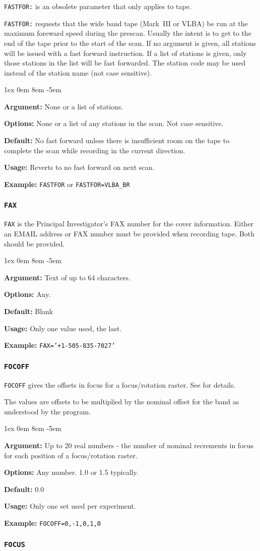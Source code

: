 \documentclass{report}
\newcommand{\rcwbox}[5]{
  \begin{list}{}{\parsep 1ex  \itemsep 0em
                 \leftmargin 8em  \itemindent -5em }
    \item {\bf Argument:} #1
    \item {\bf Options:}  #2
    \item {\bf Default:}  #3
    \item {\bf Usage:}    #4
    \item {\bf Example:}  #5
  \end{list}
}
\begin{document}
{\tt FASTFOR:} is an obsolete parameter that only applies to tape.

{\tt FASTFOR:} requests that the wide band tape (Mark~III or
VLBA) be run at the maximum foreward speed during the prescan. Usually
the intent is to get to the end of the tape prior to the start of the
scan. If no argument is given, all stations will be issued with a fast
forward instruction. If a list of stations is given, only those
stations in the list will be fast forwarded.  The station code may
be used instead of the station name (not case sensitive).

\rcwbox
{None or a list of stations.}
{None or a list of any stations in the scan. Not case sensitive.}
{No fast forward unless there is insufficient room on the tape to
complete the scan while recording in the current direction.}
{Reverts to no fast forward on next scan.}
{{\tt FASTFOR} or {\tt FASTFOR=VLBA\_BR}}


\subsubsection{\label{MP:FAX}{\tt FAX}}

{\tt FAX} is the  Principal Investigator's FAX number for the cover
information.  Either an EMAIL address or FAX number must be provided
when recording tape.  Both should be provided.

\rcwbox
{Text of up to 64 characters.}
{Any.}
{Blank}
{Only one value used, the last.}
{{\tt FAX='+1-505-835-7027'}}


\subsubsection{\label{MP:FOCOFF}\tt FOCOFF}

{\tt FOCOFF} gives the offsets in focus for a focus/rotation raster.
See  for details.

The values are offsets to be multiplied by the nominal offset
for the band as understood by the program.

\rcwbox
{Up to 20 real numbers - the number of nominal recrements in
focus for each position of a focus/rotation raster.}
{Any number.  1.0 or 1.5 typically.}
{0.0}
{Only one set used per experiment.}
{{\tt FOCOFF=0,-1,0,1,0}}


\subsubsection{\label{MP:FOCUS}\tt FOCUS}
\end{document}
